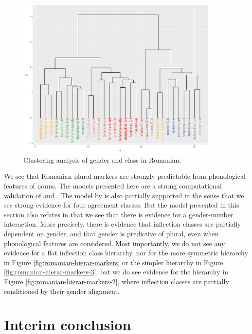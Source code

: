 \begin{figure}[!ptbh]
  \centering
  \includegraphics[width=0.9\textwidth]{./figures/romanian/romanian-clust.pdf}
  \caption{Clustering analysis of gender and class in Romanian.}\label{fig:romanian-clust-class-2}
\end{figure}

We see that Romanian plural markers are strongly predictable from phonological features of nouns. The models presented here are a strong computational validation of \textcite{Vrabie.1989} and \textcite{Vrabie.2000}. The model by \textcite{Bateman.2010} is also partially supported in the sense that we see strong evidence for four agreement classes. But the model presented in this section also refutes \citeauthor{Bateman.2010} in that we see that there is evidence for a gender-number interaction. More precisely, there is evidence that inflection classes are partially dependent on gender, and that gender is predictive of plural, even when phonological features are considered. Most importantly, we do not see any evidence for a flat inflection class hierarchy, nor for the more symmetric hierarchy in Figure \ref{fig:romanian-hierar-markers} or the simpler hierarchy in Figure \ref{fig:romanian-hierar-markers-3}, but we do see evidence for the hierarchy in Figure \ref{fig:romanian-hierar-markers-2}, where inflection classes are partially conditioned by their gender alignment.


\section{Interim conclusion}

